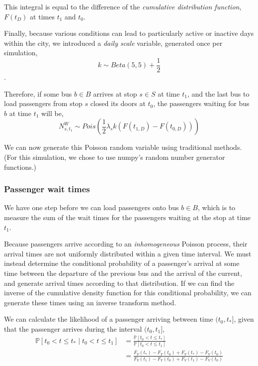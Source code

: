 \documentclass[12pt]{article}
\newcommand{\Prob}{\mathbb P}
\begin{document}
This integral is equal to the difference of the \emph{cumulative distribution
function}, $F(t_D)$ at times $t_1$ and $t_0$.

Finally, because various conditions can lead to particularly active or
inactive days within the city, we introduced a \emph{daily scale} variable,
generated once per simulation,
\[
    k \sim Beta(5, 5) + \frac{1}{2}
\].

Therefore, if some bus $b \in B$ arrives at stop $s \in S$ at time $t_1$, and
the last bus to load passengers from stop $s$ closed its doors at $t_0$, the
passengers waiting for bus $b$ at time $t_1$ will be,
\[
    N^W_{s,t_1} \sim Pois\left(\frac{1}{2}\lambda_s k \left(F(t_{1,D}) -
    F(t_{0,D})\right)\right)
\]

We can now generate this Poisson random variable using traditional methods.
(For this simulation, we chose to use numpy's random number generator
functions.)

\subsubsection{Passenger wait times}

We have one step before we can load passengers onto bus $b \in B$, which is to
measure the sum of the wait times for the passengers waiting at the stop at
time $t_1$.

Because passengers arrive according to an \emph{inhomogeneous} Poisson
process, their arrival times are not uniformly distributed within a given time
interval. We must instead determine the conditional probability of a
passenger's arrival at some time between the departure of the previous bus and
the arrival of the current, and generate arrival times according to that
distribution. If we can find the inverse of the cumulative density function
for this conditional probability, we can generate these times using an inverse
transform method.

We can calculate the likelihood of a passenger arriving between time 
$(t_0, t_*]$, given that the passenger arrives during the interval
$(t_0, t_1]$,
\begin{align*}
    \Prob[t_0 < t \le t_* \mid t_0 < t \le t_1] &= \frac{\Prob[t_0 < t \le t_*]}{\Prob[t_0 <
    t \le t_1]}\\
                                                &= \frac{F_Y(t_*) - F_Y(t_0) +
                                                F_V(t_*) - F_V(t_0)}
                                                {F_Y(t_1) - F_Y(t_0) +
                                                F_V(t_1) - F_V(t_0)}
\end{align*}
\end{document}
